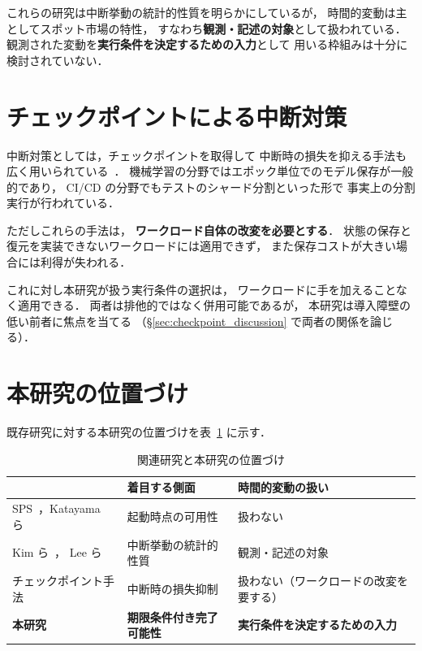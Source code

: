 \documentclass[11pt,a4paper]{ltjsreport}
\begin{document}
これらの研究は中断挙動の統計的性質を明らかにしているが，
時間的変動は主としてスポット市場の特性，
すなわち\textbf{観測・記述の対象}として扱われている．
観測された変動を\textbf{実行条件を決定するための入力}として
用いる枠組みは十分に検討されていない．

\section{チェックポイントによる中断対策}

中断対策としては，チェックポイントを取得して
中断時の損失を抑える手法も広く用いられている~\cite{Lin2022Survey}．
機械学習の分野ではエポック単位でのモデル保存が一般的であり，
CI/CD の分野でもテストのシャード分割といった形で
事実上の分割実行が行われている．

ただしこれらの手法は，
\textbf{ワークロード自体の改変を必要とする}．
状態の保存と復元を実装できないワークロードには適用できず，
また保存コストが大きい場合には利得が失われる．

これに対し本研究が扱う実行条件の選択は，
ワークロードに手を加えることなく適用できる．
両者は排他的ではなく併用可能であるが，
本研究は導入障壁の低い前者に焦点を当てる
（\S\ref{sec:checkpoint_discussion} で両者の関係を論じる）．

\section{本研究の位置づけ}

既存研究に対する本研究の位置づけを表~\ref{tab:related} に示す．

\begin{table}[htbp]
\centering
\caption{関連研究と本研究の位置づけ}
\label{tab:related}
\small
\begin{tabularx}{\textwidth}{@{}lXX@{}}
\toprule
 & \textbf{着目する側面} & \textbf{時間的変動の扱い} \\
\midrule
SPS~\cite{AWSSPS}，Katayama ら~\cite{Katayama2022}
  & 起動時点の可用性
  & 扱わない \\
\addlinespace
Kim ら~\cite{Kim2024SpotInterruption}，
Lee ら~\cite{Lee2022SpotLake}
  & 中断挙動の統計的性質
  & 観測・記述の対象 \\
\addlinespace
チェックポイント手法~\cite{Lin2022Survey}
  & 中断時の損失抑制
  & 扱わない（ワークロードの改変を要する） \\
\addlinespace
\textbf{本研究}
  & \textbf{期限条件付き完了可能性}
  & \textbf{実行条件を決定するための入力} \\
\bottomrule
\end{tabularx}
\end{table}
\end{document}
